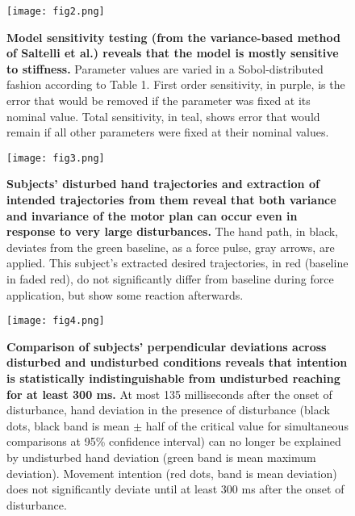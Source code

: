 \documentclass[10pt]{article}
\begin{document}
\begin{figure}[!ht]
\begin{center}
\texttt{[image: fig2.png]}
\end{center}
\caption{
{\bf Model sensitivity testing (from the variance-based method of Saltelli et al.\cite{saltelli2010variance}) reveals that the model is mostly sensitive to stiffness.} Parameter values are varied in a Sobol-distributed fashion according to Table 1. First order sensitivity, in purple, is the error that would be removed if the parameter was fixed at its nominal value. Total sensitivity, in teal, shows error that would remain if all other parameters were fixed at their nominal values.
}
\label{fig:sensitivity}
\end{figure}

\begin{figure}[!ht]
\begin{center}
\texttt{[image: fig3.png]}
\end{center}
\caption{
{\bf Subjects' disturbed hand trajectories and extraction of intended trajectories from them reveal that both variance and invariance of the motor plan can occur even in response to very large disturbances.} The hand path, in black, deviates from the green baseline, as a force pulse, gray arrows, are applied. This subject's extracted desired trajectories, in red (baseline in faded red), do not significantly differ from baseline during force application, but show some reaction afterwards.
}
\label{fig:anecdotes}
\end{figure}

\begin{figure}[!ht]
\begin{center}
\texttt{[image: fig4.png]}
\end{center}
\caption{
{\bf Comparison of subjects' perpendicular deviations across disturbed and undisturbed conditions reveals that intention is statistically indistinguishable from undisturbed reaching for at least 300 ms.} At most 135 milliseconds after the onset of disturbance, hand deviation in the presence of disturbance (black dots, black band is mean $\pm$ half of the critical value for simultaneous comparisons at 95\% confidence interval) can no longer be explained by undisturbed hand deviation (green band is mean maximum deviation). Movement intention (red dots, band is mean deviation) does not significantly deviate until at least 300 ms after the onset of disturbance.
}
\label{fig:grouptrends}
\end{figure}
\end{document}
